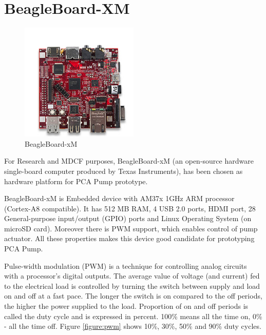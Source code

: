 \section{BeagleBoard-XM}
\label{pcapump:beagleboard}

\begin{figure}
  \begin{center}
    \includegraphics[width=0.5\textwidth]{figures/beagleboard_xm.png}
  \end{center}
  \caption{BeagleBoard-xM}
  \label{figure:beagleboard_xm}
\end{figure}

For Research and MDCF purposes, BeagleBoard-xM (an open-source hardware single-board computer produced by Texas Instruments), has been chosen as hardware platform for PCA Pump prototype.

BeagleBoard-xM is Embedded device with AM37x 1GHz ARM processor (Cortex-A8 compatible). It has 512 MB RAM, 4 USB 2.0 ports, HDMI port, 28 General-purpose input/output (GPIO) ports and Linux Operating System (on microSD card). Moreover there is PWM support, which enables control of pump actuator. All these properties makes this device good candidate for prototyping PCA Pump.

Pulse-width modulation (PWM) is a technique for controlling analog circuits with a processor's digital outputs. The average value of voltage (and current) fed to the electrical load is controlled by turning the switch between supply and load on and off at a fast pace. The longer the switch is on compared to the off periods, the higher the power supplied to the load. Proportion of on and off periods is called the duty cycle and is expressed in percent. 100\% means all the time on, 0\% - all the time off. Figure \ref{figure:pwm} shows 10\%, 30\%, 50\% and 90\% duty cycles.

